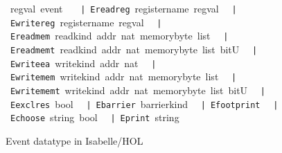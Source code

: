\documentclass[11pt]{article}
\theoremstyle{definition}
\begin{document}
\begin{figure}
\renewcommand{\isacharbar}{{\rm\texttt{|}}}
%
\begin{isabelle}
\isamarkupfalse%
\ {\isacharprime}regval\ event\ {\isacharequal}\isanewline
\ \ {\isacharbar}\ {\rm\texttt{E{\isacharunderscore}read{\isacharunderscore}reg}}\ register{\isacharunderscore}name\ {\isacharprime}regval\isanewline
\ \ {\isacharbar}\ {\rm\texttt{E{\isacharunderscore}write{\isacharunderscore}reg}}\ register{\isacharunderscore}name\ {\isacharprime}regval\isanewline
\ \ {\isacharbar}\ {\rm\texttt{E{\isacharunderscore}read{\isacharunderscore}mem}}\ read{\isacharunderscore}kind\ addr\ nat\ {\isacharparenleft}memory{\isacharunderscore}byte\ list{\isacharparenright}\isanewline
\ \ {\isacharbar}\ {\rm\texttt{E{\isacharunderscore}read{\isacharunderscore}memt}}\ read{\isacharunderscore}kind\ addr\ nat\ {\isacharparenleft}memory{\isacharunderscore}byte\ list{\isacharparenright}\ bitU\isanewline
\ \ {\isacharbar}\ {\rm\texttt{E{\isacharunderscore}write{\isacharunderscore}ea}}\ write{\isacharunderscore}kind\ addr\ nat\isanewline
\ \ {\isacharbar}\ {\rm\texttt{E{\isacharunderscore}write{\isacharunderscore}mem}}\ write{\isacharunderscore}kind\ addr\ nat\ {\isacharparenleft}memory{\isacharunderscore}byte\ list{\isacharparenright}\isanewline
\ \ {\isacharbar}\ {\rm\texttt{E{\isacharunderscore}write{\isacharunderscore}memt}}\ write{\isacharunderscore}kind\ addr\ nat\ {\isacharparenleft}memory{\isacharunderscore}byte\ list{\isacharparenright}\ bitU\isanewline
\ \ {\isacharbar}\ {\rm\texttt{E{\isacharunderscore}excl{\isacharunderscore}res}}\ bool\isanewline
\ \ {\isacharbar}\ {\rm\texttt{E{\isacharunderscore}barrier}}\ barrier{\isacharunderscore}kind\isanewline
\ \ {\isacharbar}\ {\rm\texttt{E{\isacharunderscore}footprint}}\isanewline
\ \ {\isacharbar}\ {\rm\texttt{E{\isacharunderscore}choose}}\ string\ bool\isanewline
\ \ {\isacharbar}\ {\rm\texttt{E{\isacharunderscore}print}}\ string
\end{isabelle}
\caption{Event datatype in Isabelle/HOL\label{fig:events}}
\end{figure}
\end{document}
